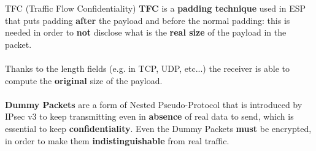 \begin{quotebox}[colframe=blue!10!white, colback=blue!5!white]{TFC (Traffic Flow Confidentiality)}
    \textbf{TFC} is a \textbf{padding technique} used in ESP that puts padding \textbf{after} the payload and before
    the normal padding: this is needed in order to \textbf{not} disclose what is the \textbf{real size} of the payload in the packet.\\     \\    
    Thanks to the length fields (e.g. in TCP, UDP, etc...) the receiver is able to compute the \textbf{original} size of the payload.\\     \\  
    \textbf{Dummy Packets} are a form of Nested Pseudo-Protocol that is introduced by IPsec v3 to keep
    transmitting even in \textbf{absence} of real data to send, which is essential to keep \textbf{confidentiality}.
    Even the Dummy Packets \textbf{must} be encrypted, in order to make them \textbf{indistinguishable} from
    real traffic.
\end{quotebox}


